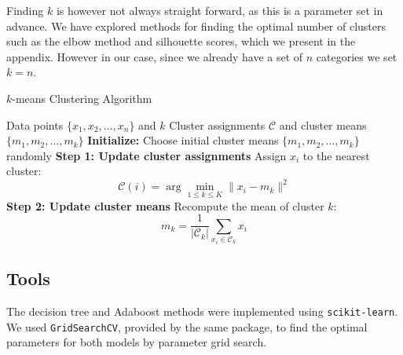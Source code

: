 Finding $k$ is however not always straight forward, as this is a parameter set in advance. We have explored methods for finding the optimal number of clusters such as the elbow method and silhouette scores, which we present in the appendix. However in our case, since we already have a set of $n$ categories we set $k = n$. 

\begin{algorithm}
\caption{\(k\)-means Clustering Algorithm}
\label{alg:kmeans}
\begin{algorithmic}[1]
\REQUIRE Data points $\{x_1, x_2, \ldots, x_n\}$ and $k$
\ENSURE Cluster assignments $\mathcal{C}$ and cluster means $\{m_1, m_2, \ldots, m_k\}$
\STATE \textbf{Initialize:} Choose initial cluster means $\{m_1, m_2, \ldots, m_k\}$ randomly
\REPEAT
    \STATE \textbf{Step 1: Update cluster assignments}
        \STATE Assign $x_i$ to the nearest cluster:
        \[
        \mathcal{C}(i) = \arg\min_{1 \leq k \leq K} \|x_i - m_k\|^2
        \]
    \ENDFOR
    \STATE \textbf{Step 2: Update cluster means}
        \STATE Recompute the mean of cluster $k$:
        \[
        m_k = \frac{1}{|\mathcal{C}_k|} \sum_{x_i \in \mathcal{C}_k} x_i
        \]
    \ENDFOR
{}
\end{algorithmic}
\end{algorithm}


\subsection{Tools} \label{subsec:tools}
The decision tree and Adaboost methods were implemented using \verb|scikit-learn|. We used \verb|GridSearchCV|, provided by the same package, to find the optimal parameters for both models by parameter grid search.


